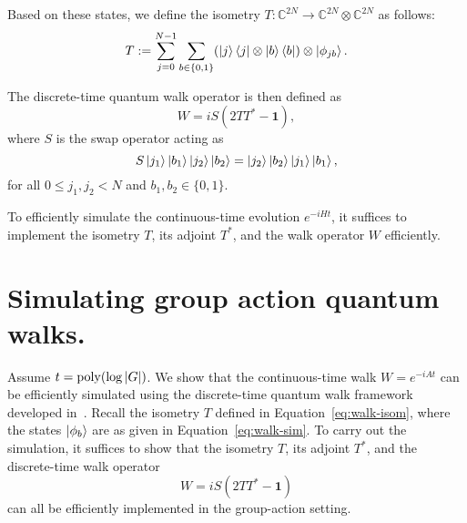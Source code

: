 \documentclass[12pt]{report}
\newcommand{\opnorm}[1]{\left\lVert #1 \right\rVert}
\begin{document}
Based on these states, we define the isometry \( T : \mathbb{C}^{2N} \to \mathbb{C}^{2N} \otimes \mathbb{C}^{2N} \) as follows:
\begin{equation}
    \label{eq:walk-isom}
    T := \sum_{j = 0}^{N - 1} \sum_{b \in \{0, 1\}} (\ket{j}\bra{j} \otimes \ket{b}\bra{b}) \otimes \ket{\phi_{jb}}.
\end{equation}

The discrete-time quantum walk operator is then defined as
\[
W = iS(2TT^* - \mathbf{1}),
\]
where \( S \) is the swap operator acting as
\[
S \ket{j_1} \ket{b_1} \ket{j_2} \ket{b_2} = \ket{j_2} \ket{b_2} \ket{j_1} \ket{b_1},
\]
for all \( 0 \le j_1, j_2 < N \) and \( b_1, b_2 \in \{0, 1\} \).

To efficiently simulate the continuous-time evolution \( e^{-iHt} \), it suffices to implement the isometry \( T \), its adjoint \( T^* \), and the walk operator \( W \) efficiently.








\section{Simulating group action quantum walks.}
Assume \( t = \operatorname{poly}(\log \abs{G}) \). We show that the continuous-time walk \( W = e^{-iAt} \) can be efficiently simulated using the discrete-time quantum walk framework developed in~\cite{childs2010relationship}. Recall the isometry \( T \) defined in Equation~\eqref{eq:walk-isom}, where the states \( \ket{\phi_b} \) are as given in Equation~\eqref{eq:walk-sim}. To carry out the simulation, it suffices to show that the isometry \( T \), its adjoint \( T^* \), and the discrete-time walk operator
\[
W = iS(2TT^* - \mathbf{1})
\]
can all be efficiently implemented in the group-action setting.
\end{document}
